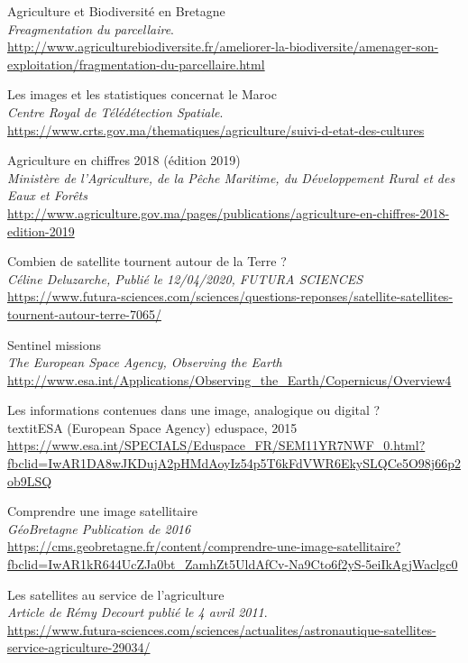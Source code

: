\documentclass[12pt, openany]{report}
\begin{document}
\begin{thebibliography}{9}


Agriculture et Biodiversité en Bretagne\\
\textit{Freagmentation du parcellaire}. \\
\url{http://www.agriculturebiodiversite.fr/ameliorer-la-biodiversite/amenager-son-exploitation/fragmentation-du-parcellaire.html}

Les images et les statistiques concernat le Maroc\\
\textit{Centre Royal de Télédétection Spatiale}.\\
\url{https://www.crts.gov.ma/thematiques/agriculture/suivi-d-etat-des-cultures}

Agriculture en chiffres 2018 (édition 2019)\\
\textit{Ministère de l'Agriculture, de la Pêche Maritime, du Développement Rural et des Eaux et Forêts}\\
\url{http://www.agriculture.gov.ma/pages/publications/agriculture-en-chiffres-2018-edition-2019}

Combien de satellite tournent autour de la Terre ?\\
\textit{Céline Deluzarche, Publié le 12/04/2020, FUTURA SCIENCES}\\
\url{https://www.futura-sciences.com/sciences/questions-reponses/satellite-satellites-tournent-autour-terre-7065/}

Sentinel missions\\
\textit{The European Space Agency, Observing the Earth}\\
\url{http://www.esa.int/Applications/Observing_the_Earth/Copernicus/Overview4}

Les informations contenues dans une image, analogique ou digital ?\\
textit{ESA (European Space Agency) eduspace, 2015}\\
\url{https://www.esa.int/SPECIALS/Eduspace_FR/SEM11YR7NWF_0.html?fbclid=IwAR1DA8wJKDujA2pHMdAoyIz54p5T6kFdVWR6EkySLQCe5O98j66p2ob9LSQ}

Comprendre une image satellitaire\\
\textit{GéoBretagne Publication de 2016}\\
\url{https://cms.geobretagne.fr/content/comprendre-une-image-satellitaire?fbclid=IwAR1kR644UcZJa0bt_ZamhZt5UldAfCv-Na9Cto6f2yS-5eiIkAgjWaclgc0}

Les satellites au service de l'agriculture\\
\textit{Article de Rémy Decourt publié le 4 avril 2011}.\\
\url{https://www.futura-sciences.com/sciences/actualites/astronautique-satellites-service-agriculture-29034/}


\end{thebibliography}
\end{document}
